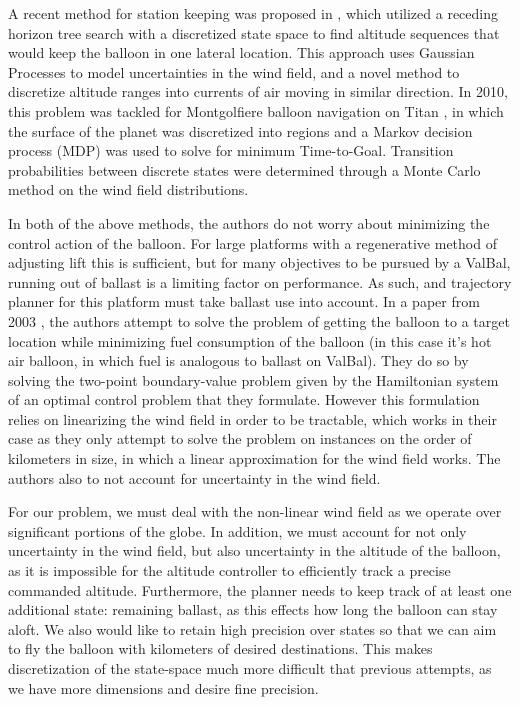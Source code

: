 \documentclass[11pt]{scrartcl} %
\begin{document}
A recent method for station keeping was proposed in \cite{DBorn}, which utilized a receding horizon tree search with a discretized state space to find altitude sequences that would keep the balloon in one lateral location. This approach uses Gaussian Processes to model uncertainties in the wind field, and a novel method to discretize altitude ranges into currents of air moving in similar direction. In 2010, this problem was tackled for Montgolfiere balloon navigation on Titan \cite{wolf2010}, in which the surface of the planet was discretized into regions and a Markov decision process (MDP) was used to solve for minimum Time-to-Goal. Transition probabilities between discrete states were determined through a Monte Carlo method on the wind field distributions. 

In both of the above methods, the authors do not worry about minimizing the control action of the balloon. For large platforms with a regenerative method of adjusting lift this is sufficient, but for many objectives to be pursued by a ValBal, running out of ballast is a limiting factor on performance. As such, and trajectory planner for this platform must take ballast use into account. In a paper from 2003  \cite{das2003optimal}, the authors attempt to solve the problem of getting the balloon to a target location while minimizing fuel consumption of the balloon (in this case it's hot air balloon, in which fuel is analogous to ballast on ValBal). They do so by solving the two-point boundary-value problem given by the Hamiltonian system of an optimal control problem that they formulate. However this formulation relies on linearizing the wind field in order to be tractable, which works in their case as they only attempt to solve the problem on instances on the order of kilometers in size, in which a linear approximation for the wind field works. The authors also to not account for uncertainty in the wind field.

For our problem, we must deal with the non-linear wind field as we operate over significant portions of the globe. In addition, we must account for not only uncertainty in the wind field, but also uncertainty in the altitude of the balloon, as it is impossible for the altitude controller to efficiently track a precise commanded altitude. Furthermore, the planner needs to keep track of at least one additional state: remaining ballast, as this effects how long the balloon can stay aloft. We also would like to retain high precision over states so that we can aim to fly the balloon with kilometers of desired destinations. This makes discretization of the state-space much more difficult that previous attempts, as we have more dimensions and desire fine precision.
\end{document}
